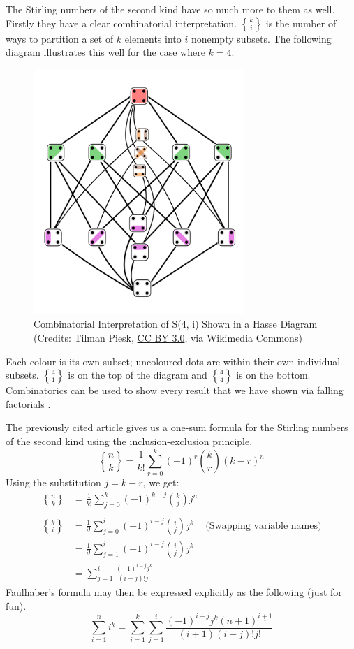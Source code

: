 \documentclass[a4paper]{article}
\theoremstyle{definition}
\begin{document}
The Stirling numbers of the second kind have so much more to them as well.
Firstly they have a clear combinatorial interpretation.
$k\brace i$ is the number of ways to partition a set of $k$ elements into $i$ nonempty subsets.
The following diagram illustrates this well for the case where $k=4$.
\begin{figure}[H]
    \centering
    \includegraphics[width=8cm, keepaspectratio]{hasse_diagram.png}
    \captionsetup{justification=centering}
    \caption{Combinatorial Interpretation of S(4, i) Shown in a Hasse Diagram
        \\(Credits: Tilman Piesk, \href{https://creativecommons.org/licenses/by/3.0/}{CC BY 3.0}, via Wikimedia Commons)}
    \label{fig:fig1}
\end{figure}
Each colour is its own subset; uncoloured dots are within their own individual subsets.
$4\brace 1$ is on the top of the diagram and $4\brace 4$ is on the bottom.
Combinatorics can be used to show every result that we have shown via falling factorials \cite{MITSstirling}.

The previously cited article gives us a one-sum formula for the Stirling numbers of the second kind using the inclusion-exclusion principle.
\begin{equation*}
    {n\brace k} = \frac{1}{k!}\sum_{r=0}^{k}(-1)^r\binom{k}{r}(k-r)^n
\end{equation*}
Using the substitution $j = k - r$, we get:
\begin{align*}
    {n\brace k}  & = \frac{1}{k!}\sum_{j=0}^{k}(-1)^{k-j}\binom{k}{j}j^n                                      \\ \\
    {k \brace i} & = \frac{1}{i!} \sum_{j=0}^i (-1)^{i-j} \binom{i}{j} j^k & \text{(Swapping variable names)} \\
                 & = \frac{1}{i!} \sum_{j=1}^i (-1)^{i-j} \binom{i}{j} j^k                                    \\
                 & = \sum_{j=1}^i \frac{(-1)^{i-j}j^k}{(i-j)!j!}
\end{align*}
Faulhaber's formula may then be expressed explicitly as the following (just for fun).
\begin{equation*}
    \sum_{i=1}^n i^k = \sum_{i=1}^k \sum_{j=1}^i \frac{(-1)^{i-j}j^k (n+1)^{\underline{i+1}}}{(i+1)(i-j)!j!}
\end{equation*}
\end{document}

